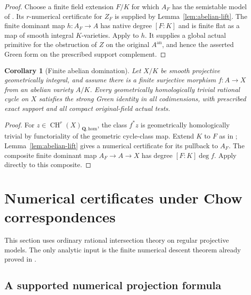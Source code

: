 \documentclass[11pt]{article}
\newtheorem{corollary}[theorem]{Corollary}
\theoremstyle{definition}
\theoremstyle{remark}
\numberwithin{equation}{section}
\newcommand{\CH}{\operatorname{CH}}
\newcommand{\an}{\mathrm{an}}
\newcommand{\homol}{\mathrm{hom}}
\begin{document}
\begin{proof}
Choose a finite field extension $F/K$ for which $A_F$ has the
semistable model of .  Its $r$-numerical
certificate for $Z_F$ is supplied by
Lemma~\ref{lem:abelian-lift}.  The finite dominant map
$h:A_F\to A$ has native degree $[F:K]$ and is finite flat as
a map of smooth integral $K$-varieties.  Apply
 to $h$.  It supplies a global actual
primitive for the obstruction of $Z$ on the original
$A^{\an}$, and hence the asserted Green form on the prescribed
support complement.
\end{proof}

\begin{corollary}[Finite abelian domination]
\label{cor:finite-abelian}
Let $X/K$ be smooth projective geometrically integral, and assume
there is a finite surjective morphism $f:A\to X$ from an abelian
variety $A/K$.  Every geometrically homologically trivial rational
cycle on $X$ satisfies the strong Green identity in all
codimensions, with prescribed exact support and all compact
original-field actual tests.
\end{corollary}

\begin{proof}
For $z\in\CH^r(X)_{\mathbf Q,\homol}$, the class
$f^*z$ is geometrically homologically trivial by functoriality
of the geometric cycle-class map.  Extend $K$ to $F$ as in
; Lemma~\ref{lem:abelian-lift} gives a
numerical certificate for its pullback to $A_F$.
The composite finite dominant map $A_F\to A\to X$ has
degree $[F:K]\deg f$.  Apply 
directly to this composite.
\end{proof}



\section{Numerical certificates under Chow correspondences}
\label{sec:correspondences}

This section uses ordinary rational intersection theory on regular
projective models.  The only analytic input is the finite numerical
descent theorem already proved in .

\subsection{A supported numerical projection formula}
\end{document}
